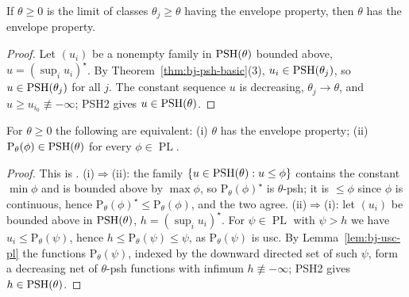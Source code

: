 \begin{lemma}\label{lem:bj-envppty}
\leanok
{}
If $\theta\ge0$ is the limit of classes $\theta_j\ge\theta$ having the envelope property, then $\theta$ has
the envelope property.
\end{lemma}

\begin{proof}
Let $(u_i)$ be a nonempty family in $\operatorname{PSH}(\theta)$ bounded above, $u=(\sup_iu_i)^\star$. By
Theorem~\ref{thm:bj-psh-basic}(3), $u_i\in\operatorname{PSH}(\theta_j)$, so $u\in\operatorname{PSH}(\theta_j)$ for all $j$. The constant
sequence $u$ is decreasing, $\theta_j\to\theta$, and $u\ge u_{i_0}\not\equiv-\infty$; PSH2 gives
$u\in\operatorname{PSH}(\theta)$.
\end{proof}

\begin{proposition}\label{prop:bj-envelope-criterion}
\leanok
{}
For $\theta\ge0$ the following are equivalent: (i) $\theta$ has the envelope property; (ii)
$\mathrm P_\theta(\phi)\in\operatorname{PSH}(\theta)$ for every $\phi\in\operatorname{PL}$.
\end{proposition}

\begin{proof}
This is \cite[Lemma~1.3]{BJadd}. (i)$\Rightarrow$(ii): the family $\{u\in\operatorname{PSH}(\theta):u\le\phi\}$ contains
the constant $\min\phi$ and is bounded above by $\max\phi$, so $\mathrm P_\theta(\phi)^\star$ is $\theta$-psh;
it is $\le\phi$ since $\phi$ is continuous, hence $\mathrm P_\theta(\phi)^\star\le\mathrm P_\theta(\phi)$, and
the two agree. (ii)$\Rightarrow$(i): let $(u_i)$ be bounded above in $\operatorname{PSH}(\theta)$, $h=(\sup_iu_i)^\star$.
For $\psi\in\operatorname{PL}$ with $\psi>h$ we have $u_i\le\mathrm P_\theta(\psi)$, hence
$h\le\mathrm P_\theta(\psi)\le\psi$, as $\mathrm P_\theta(\psi)$ is usc. By Lemma~\ref{lem:bj-usc-pl} the
functions $\mathrm P_\theta(\psi)$, indexed by the downward directed set of such $\psi$, form a decreasing
net of $\theta$-psh functions with infimum $h\not\equiv-\infty$; PSH2 gives $h\in\operatorname{PSH}(\theta)$.
\end{proof}

